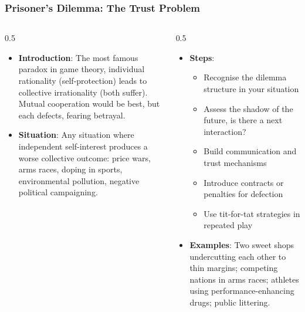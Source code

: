 \begin{frame}[fragile]\frametitle{Prisoner's Dilemma: The Trust Problem}
\begin{columns}
    \begin{column}[T]{0.5\linewidth}
      \begin{itemize}
        \item \textbf{Introduction}: The most famous paradox in game theory, individual rationality (self-protection) leads to collective irrationality (both suffer). Mutual cooperation would be best, but each defects, fearing betrayal.
        \item \textbf{Situation}: Any situation where independent self-interest produces a worse collective outcome: price wars, arms races, doping in sports, environmental pollution, negative political campaigning.
      \end{itemize}
    \end{column}
    \begin{column}[T]{0.5\linewidth}
      \begin{itemize}
        \item \textbf{Steps}:
        \begin{itemize}
          \item Recognise the dilemma structure in your situation
          \item Assess the shadow of the future, is there a next interaction?
          \item Build communication and trust mechanisms
          \item Introduce contracts or penalties for defection
          \item Use tit-for-tat strategies in repeated play
        \end{itemize}\item \textbf{Examples}: Two sweet shops undercutting each other to thin margins; competing nations in arms races; athletes using performance-enhancing drugs; public littering.
      \end{itemize}
    \end{column}
  \end{columns}
\end{frame}

